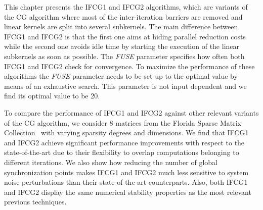 This chapter presents the IFCG1 and IFCG2 algorithms, which are variants of the CG algorithm where most of the inter-iteration barriers are removed and linear kernels are split into several subkernels. 
The main difference between IFCG1 and IFCG2 is that the first one aims at hiding parallel reduction costs while the second one avoids idle time by starting the execution of the linear subkernels as soon as possible.
The \emph{FUSE} parameter specifies how often both IFCG1 and IFCG2 check for convergence. 
To maximize the performance of these algorithms the \emph{FUSE} parameter needs to be set up to the optimal value by means of an exhaustive search.
This parameter is not input dependent and we find its optimal value to be 20.

To compare the performance of IFCG1 and IFCG2 against other relevant variants of the CG algorithm, we consider 8 matrices from the Florida Sparse Matrix Collection~\cite{florida} with varying sparsity degrees and dimensions.
We find that IFCG1 and IFCG2 achieve significant performance improvements with respect to the state-of-the-art due to their flexibility to overlap computations belonging to different iterations.
We also show how reducing the number of global synchronization points makes IFCG1 and IFCG2 much less sensitive to system noise perturbations than their state-of-the-art counterparts.
Also, both IFCG1 and IFCG2 display the same numerical stability properties as the most relevant previous techniques.

